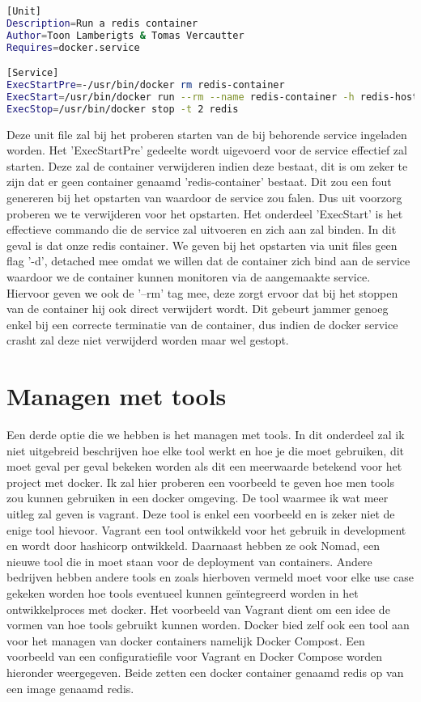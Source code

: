 \begin{lstlisting}[language=bash, style=configstyle]
[Unit]
Description=Run a redis container
Author=Toon Lamberigts & Tomas Vercautter
Requires=docker.service

[Service]
ExecStartPre=-/usr/bin/docker rm redis-container
ExecStart=/usr/bin/docker run --rm --name redis-container -h redis-host redis
ExecStop=/usr/bin/docker stop -t 2 redis
\end{lstlisting}

Deze unit file zal bij het proberen starten van de bij behorende service ingeladen worden. Het 'ExecStartPre' gedeelte wordt uigevoerd voor de service effectief zal starten. Deze zal de container verwijderen indien deze bestaat, dit is om zeker te zijn dat er geen container genaamd 'redis-container' bestaat. Dit zou een fout genereren bij het opstarten van waardoor de service zou falen. Dus uit voorzorg proberen we te verwijderen voor het opstarten. Het onderdeel 'ExecStart' is het effectieve commando die de service zal uitvoeren en zich aan zal binden. In dit geval is dat onze redis container. We geven bij het opstarten via unit files geen flag '-d', detached mee omdat we willen dat de container zich bind aan de service waardoor we de container kunnen monitoren via de aangemaakte service. Hiervoor geven we ook de '--rm' tag mee, deze zorgt ervoor dat bij het stoppen van de container hij ook direct verwijdert wordt. Dit gebeurt jammer genoeg enkel bij een correcte terminatie van de container, dus indien de docker service crasht zal deze niet verwijderd worden maar wel gestopt.

\section{Managen met tools}

Een derde optie die we hebben is het managen met tools. In dit onderdeel zal ik niet uitgebreid beschrijven hoe elke tool werkt en hoe je die moet gebruiken, dit moet geval per geval bekeken worden als dit een meerwaarde betekend voor het project met docker. Ik zal hier proberen een voorbeeld te geven hoe men tools zou kunnen gebruiken in een docker omgeving. De tool waarmee ik wat meer uitleg zal geven is vagrant. Deze tool is enkel een voorbeeld en is zeker niet de enige tool hievoor. Vagrant een tool ontwikkeld voor het gebruik in development en wordt door hashicorp ontwikkeld. Daarnaast hebben ze ook Nomad, een nieuwe tool die in moet staan voor de deployment van containers. Andere bedrijven hebben andere tools en zoals hierboven vermeld moet voor elke use case gekeken worden hoe tools eventueel kunnen geïntegreerd worden in het ontwikkelproces met docker. Het voorbeeld van Vagrant dient om een idee de vormen van hoe tools gebruikt kunnen worden. Docker bied zelf ook een tool aan voor het managen van docker containers namelijk Docker Compost. Een voorbeeld van een configuratiefile voor Vagrant en Docker Compose worden hieronder weergegeven. Beide zetten een docker container genaamd redis op van een image genaamd redis.

